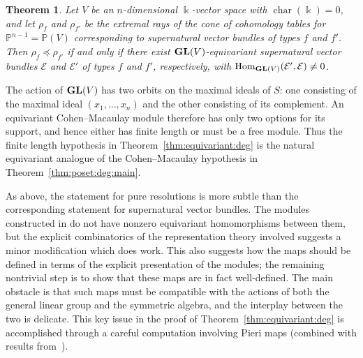 \documentclass[12pt]{amsart}
\newtheorem{thm}[equation]{Theorem}
\theoremstyle{definition}
\newcommand{\ch}{\operatorname{char}}
\newcommand{\Hom}{\operatorname{Hom}}
\newcommand{\EE}{\mathcal{E}}
\newcommand{\PP}{\mathbb{P}}
\newcommand{\GL}{{\bf GL}}
\begin{document}
\begin{thm}\label{thm:equivariant:root}
Let $V$ be an $n$-dimensional $\Bbbk$-vector space with
$\ch(\Bbbk)=0$, and let $\rho_f$ and $\rho_{f'}$ be the extremal rays
of the cone of cohomology tables for $\PP^{n-1} = \PP(V)$
corresponding to supernatural vector bundles of types $f$ and $f'$.
Then $\rho_f\preceq \rho_{f'}$ if and only if there exist
$\GL(V)$-equivariant supernatural vector bundles $\EE$ and $\EE'$ of
types $f$ and $f'$, respectively, with $\Hom_{\GL(V)}(\EE',\EE)\ne 0$.
\end{thm}

The action of $\GL(V)$ has two orbits on the maximal ideals of $S$:
one consisting of the maximal ideal $(x_1, \dots, x_n)$ and the other
consisting of its complement. An equivariant Cohen--Macaulay module
therefore has only two options for its support, and hence either has finite
length or must be a free module. Thus the finite length hypothesis in
Theorem~\ref{thm:equivariant:deg} is the natural equivariant analogue
of the Cohen--Macaulay hypothesis in Theorem~\ref{thm:poset:deg:main}.

As above, the statement for pure resolutions is more subtle than the
corresponding statement for supernatural vector bundles. The modules
constructed in \cite[\S 3]{efw} do not have nonzero equivariant
homomorphisms between them, but the explicit combinatorics of the
representation theory involved suggests a minor modification which
does work. This also suggests how the maps should be defined in terms of
the explicit presentation of the modules; the remaining nontrivial step is to
show that these maps are in fact well-defined. The main obstacle is 
that such maps must be compatible with the actions of both the
general linear group and the symmetric algebra, and the interplay
between the two is delicate. This key issue in the proof of
Theorem~\ref{thm:equivariant:deg} is accomplished through a careful 
computation involving Pieri maps (combined with results from~\cite{sam}).

\end{document}
